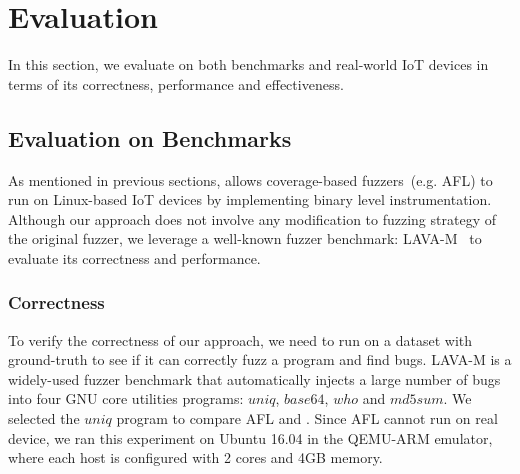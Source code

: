 \section{Evaluation}\label{sec:eval}


In this section, we evaluate \sysname on both benchmarks and real-world IoT devices in terms of its correctness, performance and effectiveness.




\subsection{Evaluation on Benchmarks}

As mentioned in previous sections, \sysname allows coverage-based fuzzers~(e.g. AFL) to run on Linux-based IoT devices by implementing binary level instrumentation. Although our approach does not involve any modification to fuzzing strategy of the original fuzzer, we leverage a well-known fuzzer benchmark: LAVA-M~\cite{dolan2016lava} to evaluate its correctness and performance. 

\subsubsection{Correctness}
To verify the correctness of our approach, we need to run \sysname on a dataset with ground-truth to see if it can correctly fuzz a program and find bugs. LAVA-M is a widely-used fuzzer benchmark that automatically injects a large number of bugs into four GNU core utilities programs: $uniq$, $base64$, $who$ and $md5sum$. We selected the $uniq$ program to compare AFL and \sysname. Since AFL cannot run on real device, we ran this experiment on Ubuntu 16.04 in the QEMU-ARM emulator, where each host is configured with 2 cores and 4GB memory. 


